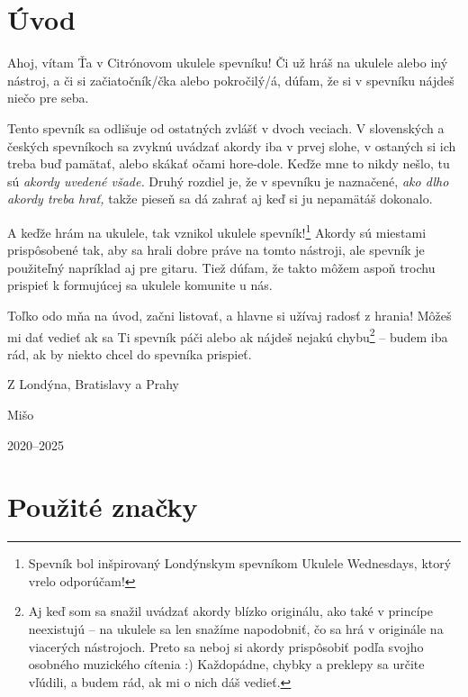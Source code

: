 \begingroup %
\setlength{\parindent}{0pt}
\setlength{\parskip}{\baselineskip}
\def\arraystretch{1.7}%
\setlength{\arrayrulewidth}{0.3mm}
\large

\section*{Úvod}

Ahoj, vítam Ťa v Citrónovom ukulele spevníku! Či už hráš na ukulele alebo iný nástroj,
a či si začiatočník/čka alebo pokročilý/á, dúfam, že si v spevníku nájdeš niečo pre seba.

Tento spevník sa odlišuje od ostatných zvlášť v dvoch veciach. V slovenských a českých
spevníkoch sa zvyknú uvádzať akordy iba v prvej slohe, v ostaných si ich treba buď
pamätať, alebo skákať očami hore-dole. Keďže mne to nikdy nešlo, tu sú
\emph{akordy uvedené všade.} Druhý rozdiel je, že v spevníku je naznačené,
\emph{ako dlho akordy treba hrať,} takže pieseň sa dá zahrať aj keď si ju
nepamätáš dokonalo.

A keďže hrám na ukulele, tak vznikol ukulele spevník!\footnote{Spevník bol inšpirovaný
Londýnskym spevníkom Ukulele Wednesdays, ktorý vrelo odporúčam!} Akordy sú miestami
prispôsobené tak, aby sa hrali dobre práve na tomto nástroji, ale spevník je použiteľný
napríklad aj pre gitaru. Tiež dúfam, že takto môžem aspoň trochu prispieť k formujúcej
sa ukulele komunite u nás.

Toľko odo mňa na úvod, začni listovať, a hlavne si užívaj radosť z hrania! Môžeš
mi dať vedieť ak sa Ti spevník páči alebo ak nájdeš nejakú chybu\footnote{
Aj keď som sa snažil uvádzať akordy blízko originálu,  ako také
v princípe neexistujú -- na ukulele sa len snažíme napodobniť, čo sa hrá v originále
na viacerých nástrojoch. Preto sa neboj si akordy prispôsobiť podľa svojho osobného
muzického cítenia :) Každopádne, chybky a preklepy sa určite vľúdili, a budem rád,
ak mi o nich dáš vedieť.
}
-- budem iba rád,
ak by niekto chcel do spevníka prispieť.

Z Londýna, Bratislavy a Prahy

{
\hspace{1cm}
Mišo

\vspace{-0.3cm}
\hspace{1cm}
2020--2025
}

\newpage
\section*{Použité značky}


